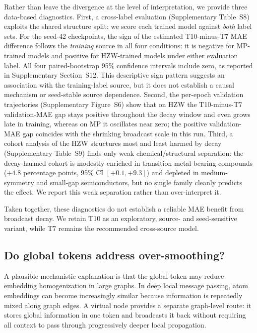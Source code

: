 \documentclass[a4paper,11pt]{article}
\begin{document}
Rather than leave the divergence at the level of interpretation, we provide three data-based diagnostics. First, a cross-label evaluation (Supplementary Table~S8) exploits the shared structure split: we score each trained model against \emph{both} label sets. For the seed-42 checkpoints, the sign of the estimated T10-minus-T7 MAE difference follows the \emph{training} source in all four conditions: it is negative for MP-trained models and positive for HZW-trained models under either evaluation label. All four paired-bootstrap 95\% confidence intervals include zero, as reported in Supplementary Section~S12. This descriptive sign pattern suggests an association with the training-label source, but it does not establish a causal mechanism or seed-stable source dependence. Second, the per-epoch validation trajectories (Supplementary Figure~S6) show that on HZW the T10-minus-T7 validation-MAE gap stays positive throughout the decay window and even grows late in training, whereas on MP it oscillates near zero; the positive validation-MAE gap coincides with the shrinking broadcast scale in this run. Third, a cohort analysis of the HZW structures most and least harmed by decay (Supplementary Table~S9) finds only weak chemical/structural separation: the decay-harmed cohort is modestly enriched in transition-metal-bearing compounds (\(+4.8\) percentage points, 95\% CI \([+0.1,+9.3]\)) and depleted in medium-symmetry and small-gap semiconductors, but no single family cleanly predicts the effect. We report this weak separation rather than over-interpret it.

Taken together, these diagnostics do not establish a reliable MAE benefit from broadcast decay. We retain T10 as an exploratory, source- and seed-sensitive variant, while T7 remains the recommended cross-source model.

\subsection{Do global tokens address over-smoothing?}
\label{sec:oversmoothing-discussion}

A plausible mechanistic explanation is that the global token may reduce embedding homogenization in large graphs. In deep local message passing, atom embeddings can become increasingly similar because information is repeatedly mixed along graph edges. A virtual node provides a separate graph-level route: it stores global information in one token and broadcasts it back without requiring all context to pass through progressively deeper local propagation.
\end{document}
